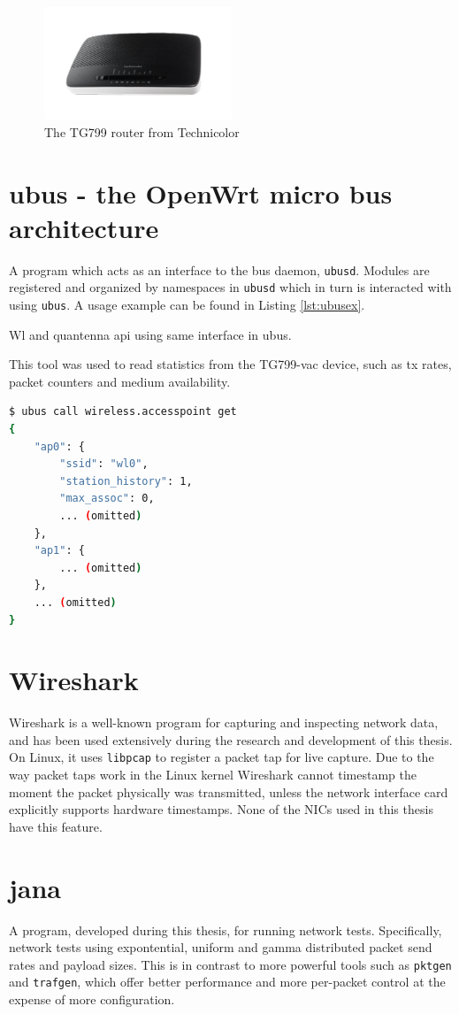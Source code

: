 \begin{figure}
\center
\includegraphics[width=0.5\textwidth]{images/tg799.png}
\caption{The TG799 router from Technicolor}
\label{fig:tg799}
\end{figure}

\section{ubus - the OpenWrt micro bus architecture}

A program which acts as an interface to the bus daemon, \texttt{ubusd}.
Modules are registered and organized by namespaces in \texttt{ubusd} which in
turn is interacted with using \texttt{ubus}. A usage example can be found in
Listing \ref{lst:ubusex}.

Wl and quantenna api using same interface in ubus.

This tool was used to read statistics from the TG799-vac device,
such as tx rates, packet counters and medium availability.

\begin{lstlisting}[language=bash,caption={ubus call listing all access points on this device},label=lst:ubusex]
$ ubus call wireless.accesspoint get
{
    "ap0": {
        "ssid": "wl0",
        "station_history": 1,
        "max_assoc": 0,
        ... (omitted)
    },
    "ap1": {
        ... (omitted)
    },
    ... (omitted)
}
\end{lstlisting}

\section{Wireshark}

Wireshark is a well-known program for capturing and inspecting network data,
and has been used extensively during the research and development of this
thesis. On Linux, it uses \texttt{libpcap} to register a packet tap for live
capture. Due to the way packet taps work in the Linux kernel Wireshark cannot
timestamp the moment the packet physically was transmitted, unless the network
interface card explicitly supports hardware timestamps. None of the NICs used
in this thesis have this feature.

\section{jana}

A program, developed during this thesis, for running network tests.
Specifically, network tests using expontential, uniform and gamma distributed
packet send rates and payload sizes. This is in contrast to more powerful
tools such as \texttt{pktgen} and \texttt{trafgen}, which offer better
performance and more per-packet control at the expense of more configuration.